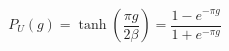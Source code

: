 \begin{equation}\label{pu}
P_{U}(g)=\tanh({\frac{\pi g}{2\beta}})=\frac{1-e^{-\pi g}}{1+e^{-\pi g}}
\end{equation}


